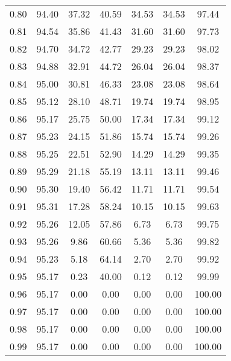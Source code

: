 \begin{tabular}{|c|c|c|c|c|c|c|}
      0.80 &     94.40 &     37.32 &      40.59 &   34.53 &      34.53 &         97.44 \\
      0.81 &     94.54 &     35.86 &      41.43 &   31.60 &      31.60 &         97.73 \\
      0.82 &     94.70 &     34.72 &      42.77 &   29.23 &      29.23 &         98.02 \\
      0.83 &     94.88 &     32.91 &      44.72 &   26.04 &      26.04 &         98.37 \\
      0.84 &     95.00 &     30.81 &      46.33 &   23.08 &      23.08 &         98.64 \\
      0.85 &     95.12 &     28.10 &      48.71 &   19.74 &      19.74 &         98.95 \\
      0.86 &     95.17 &     25.75 &      50.00 &   17.34 &      17.34 &         99.12 \\
      0.87 &     95.23 &     24.15 &      51.86 &   15.74 &      15.74 &         99.26 \\
      0.88 &     95.25 &     22.51 &      52.90 &   14.29 &      14.29 &         99.35 \\
      0.89 &     95.29 &     21.18 &      55.19 &   13.11 &      13.11 &         99.46 \\
      0.90 &     95.30 &     19.40 &      56.42 &   11.71 &      11.71 &         99.54 \\
      0.91 &     95.31 &     17.28 &      58.24 &   10.15 &      10.15 &         99.63 \\
      0.92 &     95.26 &     12.05 &      57.86 &    6.73 &       6.73 &         99.75 \\
      0.93 &     95.26 &      9.86 &      60.66 &    5.36 &       5.36 &         99.82 \\
      0.94 &     95.23 &      5.18 &      64.14 &    2.70 &       2.70 &         99.92 \\
      0.95 &     95.17 &      0.23 &      40.00 &    0.12 &       0.12 &         99.99 \\
      0.96 &     95.17 &      0.00 &       0.00 &    0.00 &       0.00 &        100.00 \\
      0.97 &     95.17 &      0.00 &       0.00 &    0.00 &       0.00 &        100.00 \\
      0.98 &     95.17 &      0.00 &       0.00 &    0.00 &       0.00 &        100.00 \\
      0.99 &     95.17 &      0.00 &       0.00 &    0.00 &       0.00 &        100.00 \\
\bottomrule
\end{tabular}
